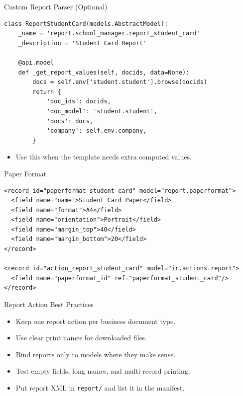 \begin{frame}[fragile]{Custom Report Parser (Optional)}
\begin{lstlisting}
class ReportStudentCard(models.AbstractModel):
	_name = 'report.school_manager.report_student_card'
	_description = 'Student Card Report'

	@api.model
	def _get_report_values(self, docids, data=None):
		docs = self.env['student.student'].browse(docids)
		return {
			'doc_ids': docids,
			'doc_model': 'student.student',
			'docs': docs,
			'company': self.env.company,
		}
\end{lstlisting}
	\begin{itemize}
		\item Use this when the template needs extra computed values.
	\end{itemize}
\end{frame}

\begin{frame}[fragile]{Paper Format}
\begin{lstlisting}[style=xml]
<record id="paperformat_student_card" model="report.paperformat">
  <field name="name">Student Card Paper</field>
  <field name="format">A4</field>
  <field name="orientation">Portrait</field>
  <field name="margin_top">40</field>
  <field name="margin_bottom">20</field>
</record>

<record id="action_report_student_card" model="ir.actions.report">
  <field name="paperformat_id" ref="paperformat_student_card"/>
</record>
\end{lstlisting}
\end{frame}

\begin{frame}{Report Action Best Practices}
	\begin{itemize}
		\item Keep one report action per business document type.
		\item Use clear print names for downloaded files.
		\item Bind reports only to models where they make sense.
		\item Test empty fields, long names, and multi-record printing.
		\item Put report XML in \texttt{report/} and list it in the manifest.
	\end{itemize}
\end{frame}
